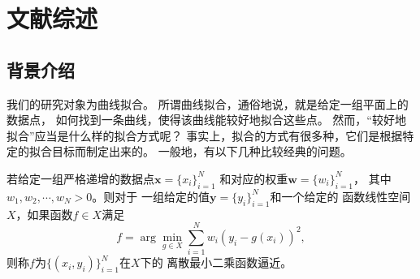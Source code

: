 \cleardoublepage
\newrefsection

\chapter{文献综述}

\section{背景介绍}
\par 我们的研究对象为曲线拟合。
所谓曲线拟合，通俗地说，就是给定一组平面上的数据点，
如何找到一条曲线，使得该曲线能较好地拟合这些点。
然而，“较好地拟合”应当是什么样的拟合方式呢？
事实上，拟合的方式有很多种，它们是根据特定的拟合目标而制定出来的。
一般地，有以下几种比较经典的问题。
\begin{defn}
  \label{def:DiscreteLeastSquaresFunctionsApproximation}
  若给定一组严格递增的数据点$\mathbf{x}=\{x_{i}\}_{i=1}^{N}$
  和对应的权重$\mathbf{w}=\{w_{i}\}_{i=1}^{N}$，
  其中$w_{1},w_{2},\cdots,w_{N}> 0$。则对于
  一组给定的值$\mathbf{y}=\{y_{i}\}_{i=1}^{N}$和一个给定的
  函数线性空间$X$，如果函数$f\in X$满足
  \begin{equation}
    \label{eq:DiscreteLeastSquaresFunctionsApproximation}
    f = \arg\min_{g\in X}\sum_{i=1}^{N}w_{i}(y_{i}-g(x_{i}))^{2},
  \end{equation}
  则称$f$为$\{(x_{i},y_{i})\}_{i=1}^{N}$在$X$下的
  离散最小二乘函数逼近。\cite{GuideToSplines}
\end{defn}

